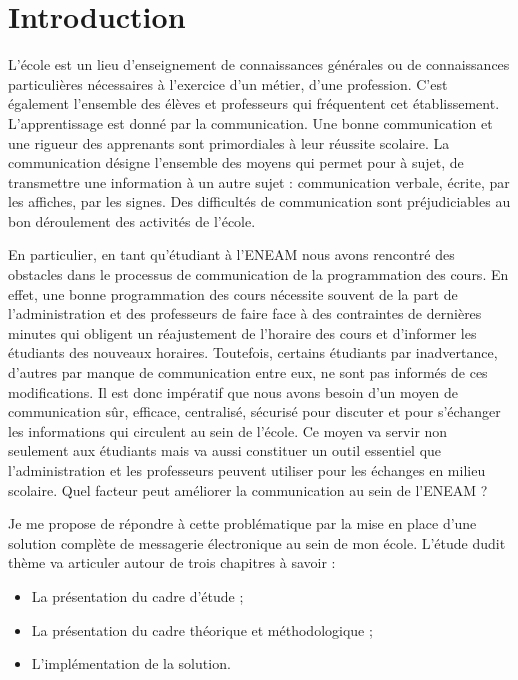 \documentclass[a4paper,12pt,french]{report} %
\begin{document}
\renewcommand{\contentsname}{Table des matières}

\tableofcontents
{}
\listoffigures
\onehalfspacing %
\clearpage
\nocesure
\chapter*{Introduction}
L’école est un lieu d’enseignement de connaissances générales ou de connaissances particulières nécessaires à l’exercice d’un métier, d’une profession. C’est également l’ensemble des élèves et professeurs qui fréquentent cet établissement. L’apprentissage est donné par la communication. Une bonne communication et une rigueur des apprenants sont primordiales à leur réussite scolaire. La communication désigne l’ensemble des moyens qui permet pour à sujet, de transmettre une information à un autre sujet : communication verbale, écrite, par les affiches, par les signes. Des difficultés de communication sont préjudiciables au bon déroulement des activités de l’école.

En particulier, en tant qu’étudiant à l’ENEAM nous avons rencontré des obstacles dans le processus de communication de la programmation des cours. En effet, une bonne programmation des cours nécessite souvent de la part de l’administration et des professeurs de faire face à des contraintes de dernières minutes qui obligent un réajustement de l’horaire des cours  et d’informer les étudiants des nouveaux horaires. Toutefois, certains étudiants par inadvertance, d’autres par manque de communication entre eux, ne sont pas informés de ces modifications. Il est donc impératif que nous avons besoin d’un moyen de communication sûr, efficace, centralisé, sécurisé pour discuter et pour s’échanger les informations qui circulent au sein de l’école. Ce moyen va servir non seulement aux étudiants mais va aussi constituer un outil essentiel que l’administration et les professeurs peuvent utiliser pour les échanges en milieu
scolaire. Quel facteur peut améliorer la communication au sein de l’ENEAM ?

Je me propose de répondre à cette problématique par la mise en place d’une solution complète de messagerie électronique au sein de mon école.
L'étude dudit thème va articuler autour de trois chapitres à savoir :
\begin{itemize}
	\item La présentation du cadre d'étude ;
	\item La présentation du cadre théorique et méthodologique ;
	\item L'implémentation de la solution.
\end{itemize}
\end{document}
